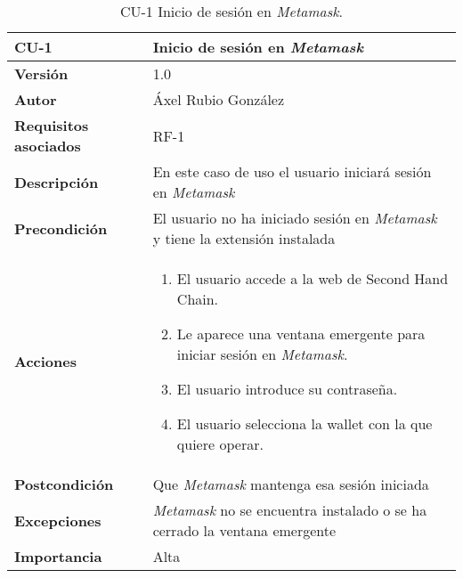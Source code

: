 \begin{table}[p]
	\centering
	\begin{tabularx}{\linewidth}{ p{} p{} }
		\toprule
		\textbf{CU-1}    & \textbf{Inicio de sesión en \textit{Metamask}}\\
		\toprule
		\textbf{Versión}              & 1.0    \\
		\textbf{Autor}                & Áxel Rubio González \\
		\textbf{Requisitos asociados} & RF-1 \\
		\textbf{Descripción}          & En este caso de uso el usuario iniciará sesión en \textit{Metamask} \\
		\textbf{Precondición}         & El usuario no ha iniciado sesión en \textit{Metamask} y tiene la extensión instalada \\
		\textbf{Acciones}             &
		\begin{enumerate}
			\def\labelenumi{\arabic{enumi}.}
			\tightlist
			\item El usuario accede a la web de Second Hand Chain.
			\item Le aparece una ventana emergente para iniciar sesión en \textit{Metamask}.
                \item El usuario introduce su contraseña.
                \item El usuario selecciona la wallet con la que quiere operar.
		\end{enumerate}\\
		\textbf{Postcondición}        & Que \textit{Metamask} mantenga esa sesión iniciada \\
		\textbf{Excepciones}          & \textit{Metamask} no se encuentra instalado o se ha cerrado la ventana emergente \\
		\textbf{Importancia}          & Alta \\
		\bottomrule
	\end{tabularx}
	\caption{CU-1 Inicio de sesión en \textit{Metamask}.}
\end{table}

